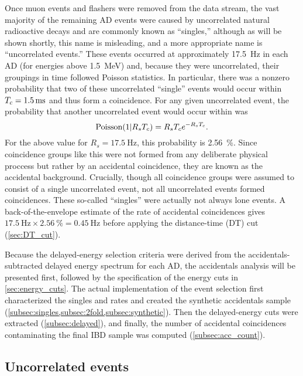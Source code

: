 Once muon events and flashers were removed from the data stream,
the vast majority of the remaining AD events were caused by uncorrelated
natural radioactive decays and are commonly known as ``singles,''
although as will be shown shortly, this name is misleading,
and a more appropriate name is ``uncorrelated events.''
These events occurred at approximately \SI{17.5}{\hertz} in each AD
(for energies above \SI{1.5}{\MeV})
and,
because they were uncorrelated, their groupings in time followed Poisson statistics.
In particular, there was a nonzero probability that
two of these uncorrelated ``single'' events would occur within
$T_c=\SI{1.5}{\milli\second}$ and thus form a  coincidence.
For any given uncorrelated event, the probability that
another uncorrelated event would occur within \tc{} was
\begin{equation}
    \text{Poisson}(1\vert R_sT_c) = R_sT_c e^{-R_sT_c}.
\end{equation}
For the above value for $R_s=\SI{17.5}{\hertz}$, this probability is \SI{2.56}{\percent}.
Since  coincidence groups like this were not formed from any
deliberate physical proccess but rather by an accidental coincidence,
they are known as the accidental background.
Crucially, though all  coincidence groups
were assumed to consist of a single uncorrelated event,
not all uncorrelated events formed  coincidences.
These so-called ``singles'' were actually not always lone events.
A back-of-the-envelope estimate of the rate of accidental coincidences gives
$\SI{17.5}{\hertz}\times\SI{2.56}{\percent}=\SI{0.45}{\hertz}$
before applying the distance-time (DT) cut (\cref{sec:DT_cut}).

Because the delayed-energy selection criteria
were derived from the accidentals-subtracted delayed energy spectrum for each AD,
the accidentals analysis will be presented first,
followed by the specification of the energy cuts in \cref{sec:energy_cuts}.
The actual implementation of the event selection
first characterized the singles and  rates
and created the synthetic accidentals sample
(\cref{subsec:singles,subsec:2fold,subsec:synthetic}).
Then the delayed-energy cuts were extracted (\cref{subsec:delayed}),
and finally, the number of accidental coincidences
contaminating the final IBD sample was computed (\cref{subsec:acc_count}).

\subsection{Uncorrelated events}
\label{subsec:singles}

